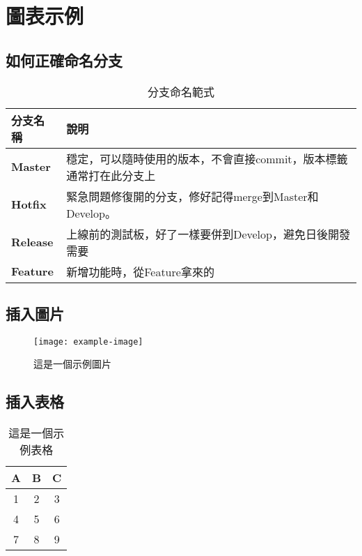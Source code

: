 \documentclass{article}
\begin{document}
\section{圖表示例}

\subsection{如何正確命名分支}
\begin{table}[H]
	\centering
	\begin{tabular}{||l|l||}
		\hline
		分支名稱 & 說明\\
		\hline
		\textbf{Master} & 穩定，可以隨時使用的版本，不會直接commit，版本標籤通常打在此分支上\\
		\hline
		\textbf{Hotfix} & 緊急問題修復開的分支，修好記得merge到Master和Develop。\\
		\hline
		\textbf{Release} & 上線前的測試板，好了一樣要併到Develop，避免日後開發需要\\
		\hline
		\textbf{Feature} & 新增功能時，從Feature拿來的\\
		\hline
	\end{tabular}
	\caption{分支命名範式}
	\label{tab:example}
\end{table}



\subsection{插入圖片}
\begin{figure}[h]
	\centering
	\texttt{[image: example-image]} %
	\caption{這是一個示例圖片}
	\label{fig:example}
\end{figure}
	
\subsection{插入表格}
\begin{table}[h]
	\centering
	\begin{tabular}{|c|c|c|}
		\hline
		A & B & C \\
		\hline
		1 & 2 & 3 \\
		4 & 5 & 6 \\
		7 & 8 & 9 \\
		\hline
	\end{tabular}
	\caption{這是一個示例表格}
	\label{tab:example}
\end{table}
	
\end{document}
